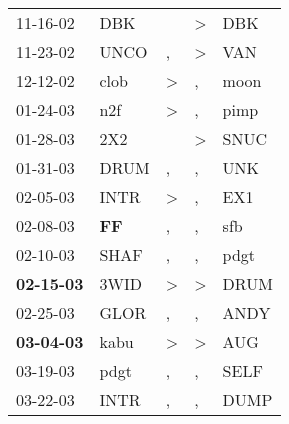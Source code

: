 \begin{supertabular}{p{0.07\textwidth}p{0.06\textwidth}p{0.02\textwidth}p{0.02\textwidth}p{0.06\textwidth}}
          11-16-02\textsuperscript{} &            DBK\textsuperscript{} &                  &     \textgreater &            DBK\textsuperscript{} \\
          11-23-02\textsuperscript{} &           UNCO\textsuperscript{} &                , &     \textgreater &            VAN\textsuperscript{} \\
          12-12-02\textsuperscript{} &           clob\textsuperscript{} &     \textgreater &                , &           moon\textsuperscript{} \\
          01-24-03\textsuperscript{} &            n2f\textsuperscript{} &     \textgreater &                , &           pimp\textsuperscript{} \\
          01-28-03\textsuperscript{} &            2X2\textsuperscript{} &                  &     \textgreater &           SNUC\textsuperscript{} \\
          01-31-03\textsuperscript{} &           DRUM\textsuperscript{} &                , &                , &            UNK\textsuperscript{} \\
          02-05-03\textsuperscript{} &           INTR\textsuperscript{} &     \textgreater &                , &            EX1\textsuperscript{} \\
          02-08-03\textsuperscript{} &    \textbf{FF\textsuperscript{}} &                , &                , &            sfb\textsuperscript{} \\
          02-10-03\textsuperscript{} &           SHAF\textsuperscript{} &                , &                , &           pdgt\textsuperscript{} \\
 \textbf{02-15-03\textsuperscript{}} &           3WID\textsuperscript{} &     \textgreater &     \textgreater &           DRUM\textsuperscript{} \\
          02-25-03\textsuperscript{} &           GLOR\textsuperscript{} &                , &                , &           ANDY\textsuperscript{} \\
 \textbf{03-04-03\textsuperscript{}} &           kabu\textsuperscript{} &     \textgreater &     \textgreater &            AUG\textsuperscript{} \\
          03-19-03\textsuperscript{} &           pdgt\textsuperscript{} &                , &                , &           SELF\textsuperscript{} \\
          03-22-03\textsuperscript{} &           INTR\textsuperscript{} &                , &                , &           DUMP\textsuperscript{} \\

\end{supertabular}
